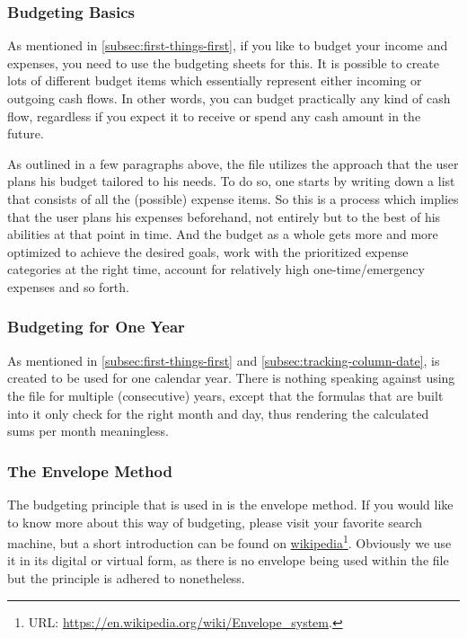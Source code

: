 \subsubsection{Budgeting Basics}
\label{subsubsec:budgeting-basics}

As mentioned in \autoref{subsec:first-things-first}, if you like to budget your income and expenses, you need to use the budgeting sheets for this.
It is possible to create lots of different budget items which essentially represent either incoming or outgoing cash flows.
In other words, you can budget practically any kind of cash flow, regardless if you expect it to receive or spend any cash amount in the future.

As outlined in a few paragraphs above, the file utilizes the approach that the user plans his budget tailored to his needs.
To do so, one starts by writing down a list that consists of all the (possible) expense items.
So this is a process which implies that the user plans his expenses beforehand, not entirely but to the best of his abilities at that point in time.
And the budget as a whole gets more and more optimized to achieve the desired goals, work with the prioritized expense categories at the right time, account for relatively high one-time/emergency expenses and so forth.

\subsubsection{Budgeting for One Year}
\label{subsubsec:budgeting-for-one-year}

As mentioned in \autoref{subsec:first-things-first} and \autoref{subsec:tracking-column-date}, \tfn is created to be used for one calendar year.
There is nothing speaking against using the file for multiple (consecutive) years, except that the formulas that are built into it only check for the right month and day, thus rendering the calculated sums per month meaningless.

\subsubsection{The Envelope Method}
\label{subsubsec:budgeting-the-envelope-method}

The budgeting principle that is used in \tfn is the envelope method.
If you would like to know more about this way of budgeting, please visit your favorite search machine, but a short introduction can be found on \href{https://en.wikipedia.org/wiki/Envelope_system}{wikipedia}\footnote{URL: \href{https://en.wikipedia.org/wiki/Envelope_system}{https://en.wikipedia.org/wiki/Envelope{\_}system}.}.
Obviously we use it in its digital or virtual form, as there is no envelope being used within the file but the principle is adhered to nonetheless.

